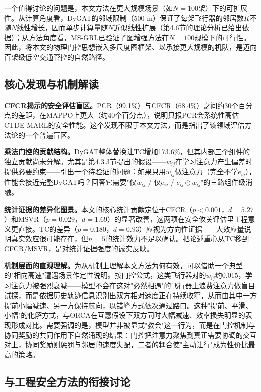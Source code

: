 \documentclass[12pt,a4paper,UTF8]{ctexart}
\begin{document}
一个值得讨论的问题是，本文方法在更大规模场景（如$N=100$架）下的可扩展性。从计算角度看，DyGAT的邻域限制（500 m）保证了每架飞行器的邻居数$K$不随$N$线性增长，因而单步计算量随$N$近似线性扩展（第4.6节的理论分析已给出依据）；从方法角度看，MS-GRL已验证了图增强方法在$N=100$规模下的可行性。因此，将本文的物理门控思想嵌入多尺度图框架、以承接更大规模的机队，是迈向百架级低空交通管控的自然路径。

\subsection{核心发现与机制解读}

\textbf{CFCR揭示的安全评估盲区。}PCR（99.1\%）与CFCR（68.4\%）之间约30个百分点的差距，在MAPPO上更大（约40个百分点），说明只报PCR会系统性高估CTDE-MARL的安全性能。这个发现不限于本文方法，而是指出了该领域评估方法论的一个普遍盲区。

\textbf{乘法门控的贡献结构。}DyGAT整体替换让TC增加173.6\%，但其内部三个组件的独立贡献尚未分解。尤其是第4.3.3节提出的假设——$w_{ij}$在学习注意力产生偏差时提供必要约束——引出一个待验证的问题：如果只用$w_{ij}$做注意力（完全不学$e_{ij}$），性能会接近完整DyGAT吗？回答它需要"仅$w_{ij}$ / 仅$e_{ij}$ / $e_{ij}\odot w_{ij}$"的三路组件级消融。

\textbf{统计证据的差异化图景。}本文的核心统计贡献定位于CFCR（$p<0.001$，$d=5.27$）和MSVR（$p=0.029$，$d=1.69$）的显著改善，这两项在安全攸关评估里工程意义更直接。TC的差异（$p=0.180$，$d=0.93$）应视为方向性证据——大效应量说明真实效应很可能存在，但$n=5$的统计效力不足以确认。把论述重心从TC移到CFCR/MSVR，是对统计证据强度的诚实反映。

\textbf{机制层面的直观理解。}为从机制上理解本文方法为何有效，可以借助一个典型的"相向高速"遭遇场景作定性说明。按门控公式，这类飞行器对的$w_{ij}$约0.015，学习注意力被强烈衰减——模型不会在这对"必然相遇"的飞行器上浪费注意力做盲目试探，而是依据历史轨迹信息识别出双方相对速度正在持续收窄，从而由其中一方提前小幅减速、另一方保持航向，以错峰方式依次通过路口。这种"提前、平滑、小幅"的化解方式，与ORCA在互惠假设下双方同时大幅减速、效率损失明显的表现形成对比。需要强调的是，模型并非被显式"教会"这一行为，而是在门控机制与协同奖励的共同作用下自然涌现的结果：门控把注意力聚焦到真正需要协调的交互对上，协同奖励则惩罚与邻居的速度失配，二者的耦合使"主动让行"成为性价比最高的策略。

\subsection{与工程安全方法的衔接讨论}
\end{document}
